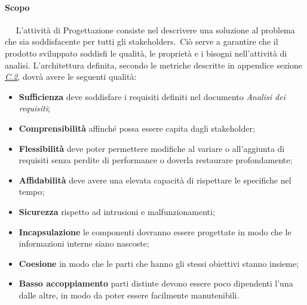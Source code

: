 	    \paragraph{Scopo}~\newline ~\newline
	    L'attività di Progettazione consiste nel descrivere una soluzione al problema che sia soddisfacente per tutti gli stakeholders\pedice.~Ciò serve a garantire che il prodotto sviluppato soddisfi le qualità, le proprietà e i bisogni nell'attività di analisi. L'architettura definita, secondo le metriche descritte in appendice sezione \textit{\underline{C.2}}, dovrà avere le seguenti qualità:
	    \begin{itemize}
	        \item \textbf{Sufficienza} deve soddisfare i requisiti definiti nel documento \textit{Analisi dei requisiti};
	        \item \textbf{Comprensibilità} affinché possa essere capita dagli stakeholder;
	        \item \textbf{Flessibilità} deve  poter  permettere  modifiche  al  variare  o  all’aggiunta  di requisiti senza perdite di performance o doverla restaurare profondamente;
	        \item \textbf{Affidabilità} deve avere una elevata capacità di rispettare le specifiche nel tempo;
	        \item \textbf{Sicurezza} rispetto ad intrusioni e malfunzionamenti;
	        \item \textbf{Incapsulazione} le componenti dovranno essere progettate in modo che le informazioni interne siano nascoste;
	        \item \textbf{Coesione} in modo che le parti che hanno gli stessi obiettivi stanno insieme;
	        \item \textbf{Basso accoppiamento} parti distinte devono essere poco dipendenti l’una dalle altre, in modo da poter essere facilmente manutenibili.
	    \end{itemize}
	    
